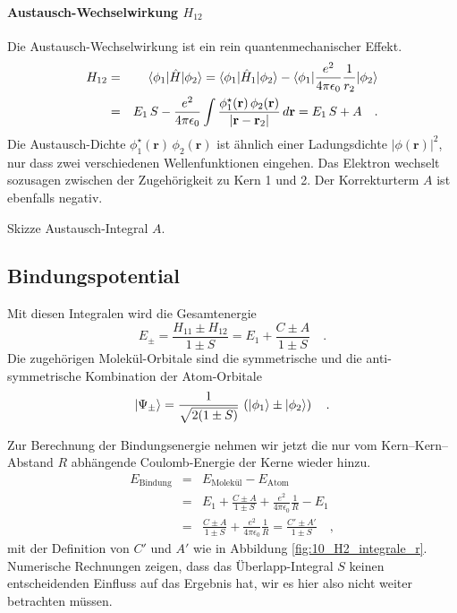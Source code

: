 \paragraph{Austausch-Wechselwirkung $H_{12}$} 
Die Austausch-Wechselwirkung ist ein rein quantenmechanischer Effekt.
\begin{eqnarray}
H_{12} &= &  \braket{\phi_1 | \hat{H} | \phi_2} = \braket{\phi_1 | \hat{H}_1 | \phi_2}  - \braket{\phi_1 |  \frac{e^2}{4 \pi \epsilon_0} \frac{1}{r_{2}} | \phi_2}  \\
 & = & E_1 \, S - \frac{e^2}{4 \pi \epsilon_0} \int \frac{ \phi_1^\star(\mathbf{r}) \, \phi_2(\mathbf{r})  }{|\mathbf{r} - \mathbf{r}_2  |} \, d\mathbf{r} = E_1 \, S + A \quad .
\end{eqnarray}
Die Austausch-Dichte $\phi_1^\star(\mathbf{r}) \, \phi_2(\mathbf{r})$ ist ähnlich einer Ladungsdichte $|\phi(\mathbf{r})|^2$, nur dass zwei verschiedenen Wellenfunktionen eingehen. Das Elektron wechselt sozusagen zwischen der Zugehörigkeit zu Kern 1 und 2. Der Korrekturterm $A$ ist ebenfalls negativ.

\begin{marginfigure}
  \caption{Skizze Austausch-Integral $A$.}
  \end{marginfigure}


\subsection{Bindungspotential}

Mit diesen Integralen wird die Gesamtenergie
\begin{equation}
E_\pm = \frac{H_{11} \pm H_{12}}{1 \pm S} = E_1 + \frac{C \pm A}{1 \pm S} \quad .
\end{equation}
Die zugehörigen Molekül-Orbitale sind die symmetrische und die anti-symmetrische Kombination der Atom-Orbitale
\begin{equation}
\ket{\Psi_\pm }= \frac{1}{\sqrt{2 (1 \pm  S)}} \, \left( \ket{\phi_1} \pm \ket{\phi_2} \right) \quad .
\end{equation}

Zur Berechnung der Bindungsenergie nehmen wir jetzt die nur vom Kern--Kern--Abstand $R$ abhängende Coulomb-Energie der Kerne wieder hinzu. 
%
\begin{eqnarray}
 E_\text{Bindung} &=&  E_\text{Molekül} -  E_\text{Atom} \\
  &=&   E_1 + \frac{C \pm A}{1 \pm S} + \frac{e^2}{4 \pi \epsilon_0} \frac{1}{R} - E_1 \\
   &=&\frac{C \pm A}{1 \pm S} + \frac{e^2}{4 \pi \epsilon_0} \frac{1}{R}  = \frac{C' \pm A'}{1 \pm S}  \quad , \label{eq:10_E_bindung_h2p}
\end{eqnarray}
mit der Definition  von $C'$ und $A'$ wie in Abbildung \ref{fig:10_H2_integrale_r}.
Numerische Rechnungen zeigen, dass das Überlapp-Integral $S$ keinen entscheidenden Einfluss auf das Ergebnis hat, wir es hier also nicht weiter betrachten müssen.

